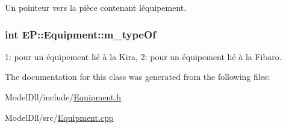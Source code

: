 Un pointeur vers la pièce contenant l\textquotesingle{}équipement. 

\subsubsection[{\texorpdfstring{m\+\_\+type\+Of}{m_typeOf}}]{\setlength{\rightskip}{0pt plus 5cm}int E\+P\+::\+Equipment\+::m\+\_\+type\+Of\hspace{0.3cm}{\ttfamily [protected]}}\hypertarget{class_e_p_1_1_equipment_abf8f83a01b6843ffc15cc8b77254dbe3}{}\label{class_e_p_1_1_equipment_abf8f83a01b6843ffc15cc8b77254dbe3}


1\+: pour un équipement lié à la Kira, 2\+: pour un équipement lié à la Fibaro. 



The documentation for this class was generated from the following files\+:\begin{DoxyCompactItemize}
\item 
Model\+Dll/include/\hyperlink{_equipment_8h}{Equipment.\+h}\item 
Model\+Dll/src/\hyperlink{_equipment_8cpp}{Equipment.\+cpp}\end{DoxyCompactItemize}
